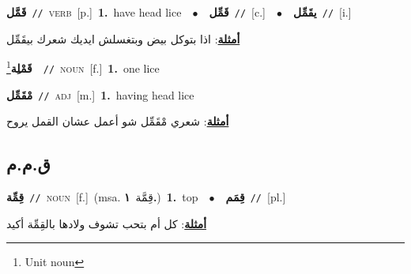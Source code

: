 \documentclass[10pt,a4paper,twoside]{article} %
\begin{document}
\begin{multicols}{2}
{\setlength\topsep{0pt}\textbf{\foreignlanguage{arabic}{قَمَّل}}\ {\color{gray}\texttt{//}\color{black}}\ \textsc{verb}\ [p.]\ \textbf{1.}~have head lice\ \ $\bullet$\ \ \setlength\topsep{0pt}\textbf{\foreignlanguage{arabic}{قَمِّل}}\ {\color{gray}\texttt{//}\color{black}}\ [c.]\ \ $\bullet$\ \ \setlength\topsep{0pt}\textbf{\foreignlanguage{arabic}{يقَمِّل}}\ {\color{gray}\texttt{//}\color{black}}\ [i.]\  \begin{flushright}\color{gray}\foreignlanguage{arabic}{\textbf{\underline{\foreignlanguage{arabic}{أمثلة}}}: اذا بتوكل بيض وبتغسلش ايديك شعرك بيقَمِّل}\end{flushright}\color{black}} \vspace{2mm}

{\setlength\topsep{0pt}\textbf{\foreignlanguage{arabic}{قَمْلِة}}\footnote{Unit noun}\ \ {\color{gray}\texttt{//}\color{black}}\ \textsc{noun}\ [f.]\ \textbf{1.}~one lice\ } \vspace{2mm}

{\setlength\topsep{0pt}\textbf{\foreignlanguage{arabic}{مْقَمِّل}}\ {\color{gray}\texttt{//}\color{black}}\ \textsc{adj}\ [m.]\ \textbf{1.}~having head lice\  \begin{flushright}\color{gray}\foreignlanguage{arabic}{\textbf{\underline{\foreignlanguage{arabic}{أمثلة}}}: شعري مْقَمِّل شو أعمل عشان القمل يروح}\end{flushright}\color{black}} \vspace{2mm}

\vspace{-3mm}
\subsection*{\color{blue}\foreignlanguage{arabic}{ق.م.م}\color{blue}{}} 

{\setlength\topsep{0pt}\textbf{\foreignlanguage{arabic}{قِمِّة}}\ {\color{gray}\texttt{//}\color{black}}\ \textsc{noun}\ [f.]\ \color{gray}(msa. \foreignlanguage{arabic}{قِمَّة}~\foreignlanguage{arabic}{\textbf{١.}})\color{black}\ \textbf{1.}~top\ \ $\bullet$\ \ \setlength\topsep{0pt}\textbf{\foreignlanguage{arabic}{قِمَم}}\ {\color{gray}\texttt{//}\color{black}}\ [pl.]\  \begin{flushright}\color{gray}\foreignlanguage{arabic}{\textbf{\underline{\foreignlanguage{arabic}{أمثلة}}}: كل أم بتحب تشوف ولادها بالقِمِّة أكيد}\end{flushright}\color{black}} \vspace{2mm}


\end{multicols}
\end{document}
